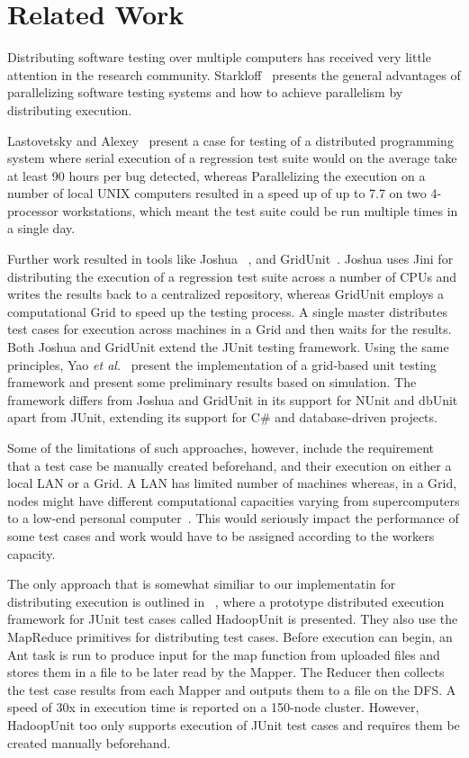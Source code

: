 \section{Related Work}\label{sec:rw}
Distributing software testing over multiple computers has received very little attention in the research community. Starkloff~\cite{stark} presents the general advantages of parallelizing software testing systems and how to achieve parallelism by distributing execution. 

Lastovetsky and Alexey~\cite{lasto} present a case for testing of a distributed programming system where serial execution of a regression test suite would on the average take at least 90 hours per bug detected, whereas Parallelizing the execution on a number of local UNIX computers resulted in a speed up of up to 7.7 on two 4-processor workstations, which meant the test suite could be run multiple times in a single day.

Further work resulted in tools like Joshua ~\cite{Kap}, and GridUnit~\cite{Duarte1, Duarte2, Duarte3}. 
Joshua uses Jini for distributing the execution of a regression test suite across a number of CPUs and 
writes the results back to a centralized repository, whereas GridUnit employs a computational Grid to speed up the testing process. 
A single master distributes test cases for execution across machines in a Grid and then waits for the results.
Both Joshua and GridUnit extend the JUnit testing framework. Using the same principles, Yao \textit{et al.}~\cite{yao} present the implementation of a grid-based unit testing framework and present some preliminary results based on simulation. 
The framework  differs from Joshua and GridUnit in its support for NUnit and dbUnit apart from JUnit, extending its support for C\# and database-driven projects.

Some of the limitations of such approaches, however, include the requirement that a test case be manually created beforehand, and their execution on either a local LAN or a Grid. A LAN has limited number of machines whereas, in a Grid, nodes might have different computational capacities varying from supercomputers to a low-end personal computer~\cite{yao}. This would seriously impact the performance 
of some test cases and work would have to be assigned according to the workers capacity. 

The only approach that is somewhat similiar to our implementatin for distributing execution is outlined in ~\cite{parveen}, where a prototype distributed execution framework for 
JUnit test cases called HadoopUnit is presented. They also use the MapReduce primitives for distributing test cases. Before execution can begin, an Ant task is run 
to produce input for the map function from uploaded files and stores them in a file to be later read by the Mapper. The Reducer then collects the test case results from each Mapper 
and outputs them to a file on the DFS. A speed of 30x in execution time is reported on a 150-node cluster. 
However, HadoopUnit too only supports execution of JUnit test cases and requires them be created manually beforehand. 

